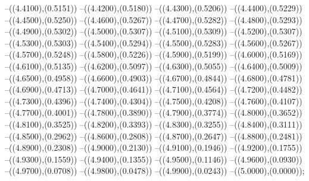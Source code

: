 {	--({\sx*(4.4100)},{\sy*(0.5151)})
	--({\sx*(4.4200)},{\sy*(0.5180)})
	--({\sx*(4.4300)},{\sy*(0.5206)})
	--({\sx*(4.4400)},{\sy*(0.5229)})
	--({\sx*(4.4500)},{\sy*(0.5250)})
	--({\sx*(4.4600)},{\sy*(0.5267)})
	--({\sx*(4.4700)},{\sy*(0.5282)})
	--({\sx*(4.4800)},{\sy*(0.5293)})
	--({\sx*(4.4900)},{\sy*(0.5302)})
	--({\sx*(4.5000)},{\sy*(0.5307)})
	--({\sx*(4.5100)},{\sy*(0.5309)})
	--({\sx*(4.5200)},{\sy*(0.5307)})
	--({\sx*(4.5300)},{\sy*(0.5303)})
	--({\sx*(4.5400)},{\sy*(0.5294)})
	--({\sx*(4.5500)},{\sy*(0.5283)})
	--({\sx*(4.5600)},{\sy*(0.5267)})
	--({\sx*(4.5700)},{\sy*(0.5248)})
	--({\sx*(4.5800)},{\sy*(0.5226)})
	--({\sx*(4.5900)},{\sy*(0.5199)})
	--({\sx*(4.6000)},{\sy*(0.5169)})
	--({\sx*(4.6100)},{\sy*(0.5135)})
	--({\sx*(4.6200)},{\sy*(0.5097)})
	--({\sx*(4.6300)},{\sy*(0.5055)})
	--({\sx*(4.6400)},{\sy*(0.5009)})
	--({\sx*(4.6500)},{\sy*(0.4958)})
	--({\sx*(4.6600)},{\sy*(0.4903)})
	--({\sx*(4.6700)},{\sy*(0.4844)})
	--({\sx*(4.6800)},{\sy*(0.4781)})
	--({\sx*(4.6900)},{\sy*(0.4713)})
	--({\sx*(4.7000)},{\sy*(0.4641)})
	--({\sx*(4.7100)},{\sy*(0.4564)})
	--({\sx*(4.7200)},{\sy*(0.4482)})
	--({\sx*(4.7300)},{\sy*(0.4396)})
	--({\sx*(4.7400)},{\sy*(0.4304)})
	--({\sx*(4.7500)},{\sy*(0.4208)})
	--({\sx*(4.7600)},{\sy*(0.4107)})
	--({\sx*(4.7700)},{\sy*(0.4001)})
	--({\sx*(4.7800)},{\sy*(0.3890)})
	--({\sx*(4.7900)},{\sy*(0.3774)})
	--({\sx*(4.8000)},{\sy*(0.3652)})
	--({\sx*(4.8100)},{\sy*(0.3525)})
	--({\sx*(4.8200)},{\sy*(0.3393)})
	--({\sx*(4.8300)},{\sy*(0.3255)})
	--({\sx*(4.8400)},{\sy*(0.3111)})
	--({\sx*(4.8500)},{\sy*(0.2962)})
	--({\sx*(4.8600)},{\sy*(0.2808)})
	--({\sx*(4.8700)},{\sy*(0.2647)})
	--({\sx*(4.8800)},{\sy*(0.2481)})
	--({\sx*(4.8900)},{\sy*(0.2308)})
	--({\sx*(4.9000)},{\sy*(0.2130)})
	--({\sx*(4.9100)},{\sy*(0.1946)})
	--({\sx*(4.9200)},{\sy*(0.1755)})
	--({\sx*(4.9300)},{\sy*(0.1559)})
	--({\sx*(4.9400)},{\sy*(0.1355)})
	--({\sx*(4.9500)},{\sy*(0.1146)})
	--({\sx*(4.9600)},{\sy*(0.0930)})
	--({\sx*(4.9700)},{\sy*(0.0708)})
	--({\sx*(4.9800)},{\sy*(0.0478)})
	--({\sx*(4.9900)},{\sy*(0.0243)})
	--({\sx*(5.0000)},{\sy*(0.0000)});
}

